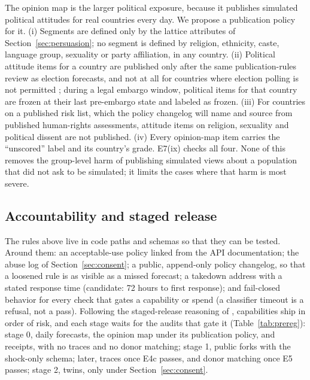 \documentclass[11pt]{article}
\begin{document}
The opinion map is the larger political exposure, because it publishes simulated political attitudes for real countries every day. We propose a publication policy for it. (i) Segments are defined only by the lattice attributes of Section~\ref{sec:persuasion}; no segment is defined by religion, ethnicity, caste, language group, sexuality or party affiliation, in any country. (ii) Political attitude items for a country are published only after the same publication-rules review as election forecasts, and not at all for countries where election polling is not permitted \citep{esomarwapor2023}; during a legal embargo window, political items for that country are frozen at their last pre-embargo state and labeled as frozen. (iii) For countries on a published risk list, which the policy changelog will name and source from published human-rights assessments, attitude items on religion, sexuality and political dissent are not published. (iv) Every opinion-map item carries the ``unscored'' label and its country's grade. E7(ix) checks all four. None of this removes the group-level harm of publishing simulated views about a population that did not ask to be simulated; it limits the cases where that harm is most severe.

\subsection{Accountability and staged release}
\label{sec:stages}

The rules above live in code paths and schemas so that they can be tested. Around them: an acceptable-use policy linked from the API documentation; the abuse log of Section~\ref{sec:consent}; a public, append-only policy changelog, so that a loosened rule is as visible as a missed forecast; a takedown address with a stated response time (candidate: 72 hours to first response); and fail-closed behavior for every check that gates a capability or spend (a classifier timeout is a refusal, not a pass). Following the staged-release reasoning of \citet{solaiman2023gradient}, capabilities ship in order of risk, and each stage waits for the audits that gate it (Table~\ref{tab:prereg}): stage 0, daily forecasts, the opinion map under its publication policy, and receipts, with no traces and no donor matching; stage 1, public forks with the shock-only schema; later, traces once E4c passes, and donor matching once E5 passes; stage 2, twins, only under Section~\ref{sec:consent}.
\end{document}
